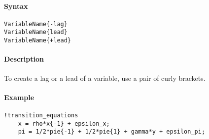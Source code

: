 


	\paragraph{Syntax}\label{syntax}

\begin{verbatim}
VariableName{-lag}
VariableName{lead}
VariableName{+lead}
\end{verbatim}

\paragraph{Description}\label{description}

To create a lag or a lead of a variable, use a pair of curly brackets.

\paragraph{Example}\label{example}

\begin{verbatim}
!transition_equations
    x = rho*x{-1} + epsilon_x;
    pi = 1/2*pie{-1} + 1/2*pie{1} + gamma*y + epsilon_pi;
\end{verbatim}


